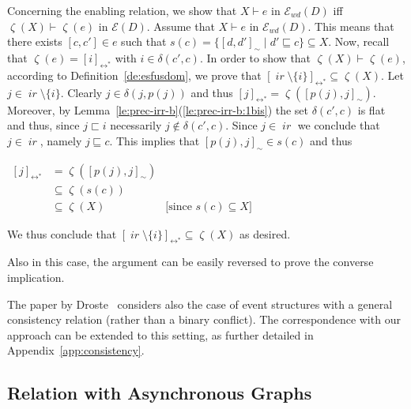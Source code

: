 \documentclass[conference]{IEEEtran}
\renewenvironment{proof}{\begin{IEEEproof}}{\end{IEEEproof}}
\newcommand{\ir}[1]{\ensuremath{\mathop{\mathit{ir}({#1})}}}
\newcommand{\diff}[2]{\ensuremath{\delta({#1},{#2})}}
\newcommand{\pred}[1]{\ensuremath{\mathit{p}({#1})}}
\newcommand{\eqclass}[2][]{\ensuremath{[{#2}]_{\scriptscriptstyle {#1}}}}
\newcommand{\eqclassir}[1]{\ensuremath{\eqclass[\leftrightarrow^*]{#1}}}
\newcommand{\zev}[0]{\ensuremath{\mathcal{E}}}
\newcommand{\ev}[1]{\ensuremath{\zev({#1})}}
\newcommand{\zevwd}[0]{\ensuremath{\mathcal{E}_{wd}}}
\newcommand{\evwd}[1]{\ensuremath{\zevwd({#1})}}
\newcommand{\dint}[2]{\ensuremath{[{#1},{#2}]}}
\newcommand{\inir}{\ensuremath{\mathop{\mathit{\zeta}}}}
\begin{document}
\begin{proof}
  Concerning the enabling relation, we show that $X \vdash e$ in
  $\evwd{D}$ iff $\inir(X) \vdash \inir(e)$ in $\ev{D}$.
  Assume that $X \vdash e$ in $\evwd{D}$. This means that there exists
  $\dint{c}{c'} \in e$ such that
  $s(c) = \{ \dint{d}{d'}_{\sim} \mid d' \sqsubseteq c \} \subseteq
  X$.
  Now, recall that $\inir(e) = \eqclassir{i}$ with
  $i \in \diff{c'}{c}$.
  In order to show that $\inir(X) \vdash \inir(e)$, according to
  Definition~\ref{de:esfusdom}, we prove that
  $\eqclassir{\ir{i} \setminus \{ i\}} \subseteq \inir(X)$.
  Let $j \in \ir{i} \setminus \{ i \}$. Clearly
  $j \in \diff{j}{\pred{j}}$ and thus
  $\eqclassir{j} = \inir(\dint{\pred{j}}{j}_{\sim})$.
  Moreover, by
  Lemma~\ref{le:prec-irr-b}(\ref{le:prec-irr-b:1bis}) the set
  $\diff{c'}{c}$ is flat and thus, since $j \sqsubset i$
  necessarily $j \not\in \diff{c'}{c}$. Since
  $j \in \ir{c'}$ we conclude that $j \in \ir{c}$, namely
  $j \sqsubseteq c$.
  This implies that $\dint{\pred{j}}{j}_{\sim} \in s(c)$ and thus
  \begin{center}
    $
    \begin{array}{lll}
      \eqclassir{j} & = \inir(\dint{\pred{j}}{j}_{\sim}) & \\
      & \subseteq \inir(s(c)) & \\
      & \subseteq \inir(X) & \mbox{[since $s(c) \subseteq X$]}
    \end{array}
    $
  \end{center}
  We thus conclude that
  $\eqclassir{\ir{i} \setminus \{ i\}} \subseteq \inir(X)$ as desired.

  Also in this case, the argument can be easily reversed to prove the
  converse implication.
\end{proof}

The paper by Droste~\cite{Dro:ESD} considers also the case of event
structures with a general consistency relation (rather than a binary
conflict). The correspondence with our approach can be extended to this setting, as further detailed in Appendix~\ref{app:consistency}.


\subsection{Relation with Asynchronous Graphs}
\label{ss:async-graphs}
 
\end{document}
